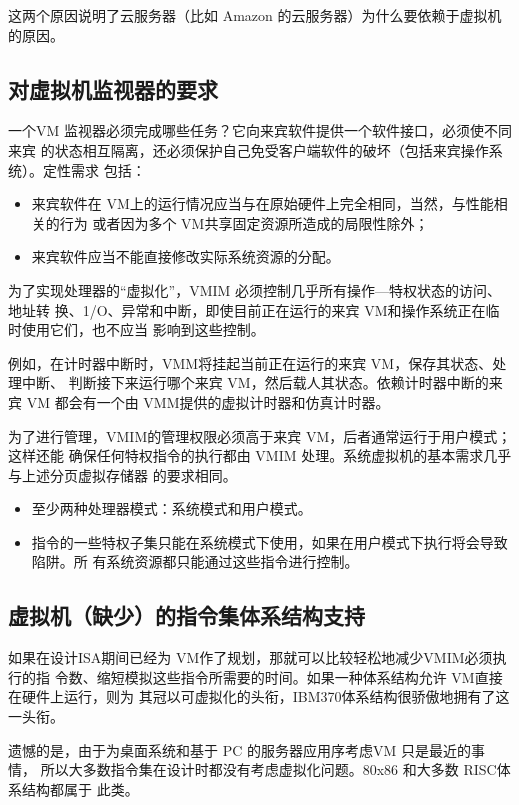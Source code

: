 这两个原因说明了云服务器（比如 Amazon 的云服务器）为什么要依赖于虚拟机的原因。

\subsection{对虛拟机监视器的要求}
一个VM 监视器必须完成哪些任务？它向来宾软件提供一个软件接口，必须使不同来宾
的状态相互隔离，还必须保护自己免受客户端软件的破坏（包括来宾操作系统）。定性需求
包括：
\begin{itemize}
    \item 来宾软件在 VM上的运行情况应当与在原始硬件上完全相同，当然，与性能相关的行为
    或者因为多个 VM共享固定资源所造成的局限性除外；
    \item 来宾软件应当不能直接修改实际系统资源的分配。
\end{itemize}

为了实现处理器的“虚拟化”，VMIM 必须控制几乎所有操作—特权状态的访问、地址转
换、1/O、异常和中断，即使目前正在运行的来宾 VM和操作系统正在临时使用它们，也不应当
影响到这些控制。

例如，在计时器中断时，VMM将挂起当前正在运行的来宾 VM，保存其状态、处理中断、
判断接下来运行哪个来宾 VM，然后载人其状态。依赖计时器中断的来宾 VM 都会有一个由
VMM提供的虚拟计时器和仿真计时器。

为了进行管理，VMIM的管理权限必须高于来宾 VM，后者通常运行于用户模式；这样还能
确保任何特权指令的执行都由 VMIM 处理。系统虚拟机的基本需求几乎与上述分页虚拟存储器
的要求相同。

\begin{itemize}
    \item 至少两种处理器模式：系统模式和用户模式。
    \item 指令的一些特权子集只能在系统模式下使用，如果在用户模式下执行将会导致陷阱。所
    有系统资源都只能通过这些指令进行控制。
\end{itemize}

\subsection{虚拟机（缺少）的指令集体系结构支持}

如果在设计ISA期间已经为 VM作了规划，那就可以比较轻松地减少VMIM必须执行的指
令数、缩短模拟这些指令所需要的时间。如果一种体系结构允许 VM直接在硬件上运行，则为
其冠以可虚拟化的头衔，IBM370体系结构很骄傲地拥有了这一头衔。

遗憾的是，由于为桌面系统和基于 PC 的服务器应用序考虑VM 只是最近的事情，
所以大多数指令集在设计时都没有考虑虚拟化问题。80x86 和大多数 RISC体系结构都属于
此类。


